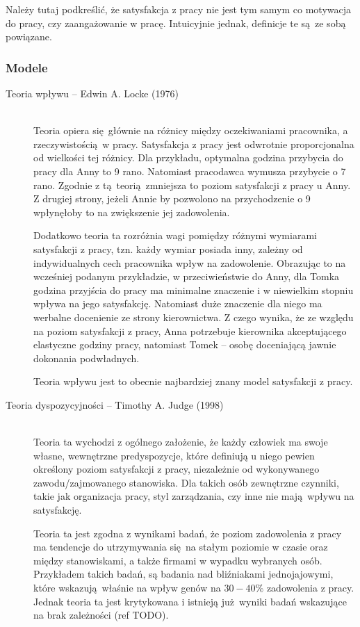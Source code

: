 Należy tutaj podkreślić, że satysfakcja z pracy nie jest tym samym co motywacja do pracy, czy zaangażowanie w pracę. Intuicyjnie jednak, definicje te są ze sobą powiązane.

\subsubsection{Modele}
\begin{description}
\item[Teoria wpływu -- Edwin A. Locke (1976)] \hfill \\
Teoria opiera się głównie na różnicy między oczekiwaniami pracownika, a rzeczywistością w pracy. Satysfakcja z pracy jest odwrotnie proporcjonalna od wielkości tej różnicy. Dla przykładu, optymalna godzina przybycia do pracy dla Anny to 9 rano. Natomiast pracodawca wymusza przybycie o 7 rano. Zgodnie z tą teorią zmniejsza to poziom satysfakcji z pracy u Anny. Z drugiej strony, jeżeli Annie by pozwolono na przychodzenie o 9 wpłynęłoby to na zwiększenie jej zadowolenia.

Dodatkowo teoria ta rozróżnia wagi pomiędzy różnymi wymiarami satysfakcji z pracy, tzn. każdy wymiar posiada inny, zależny od indywidualnych cech pracownika wpływ na zadowolenie. Obrazując to na wcześniej podanym przykładzie, w przeciwieństwie do Anny, dla Tomka godzina przyjścia do pracy ma minimalne znaczenie i w niewielkim stopniu wpływa na jego satysfakcję. Natomiast duże znaczenie dla niego ma werbalne docenienie ze strony kierownictwa. Z czego
wynika, że ze względu na poziom satysfakcji z pracy, Anna potrzebuje kierownika akceptującego elastyczne godziny pracy, natomiast Tomek -- osobę doceniającą jawnie dokonania podwładnych.

Teoria wpływu jest to obecnie najbardziej znany model satysfakcji z pracy.
\item[Teoria dyspozycyjności -- Timothy A. Judge (1998)] \hfill \\
Teoria ta wychodzi z ogólnego założenie, że każdy człowiek ma swoje własne, wewnętrzne predyspozycje, które definiują u niego pewien określony poziom satysfakcji z pracy, niezależnie od wykonywanego zawodu/zajmowanego stanowiska. Dla takich osób zewnętrzne czynniki, takie jak organizacja pracy, styl zarządzania, czy inne nie mają wpływu na satysfakcję.

Teoria ta jest zgodna z wynikami badań, że poziom zadowolenia z pracy ma tendencje do utrzymywania się na stałym poziomie w czasie oraz między stanowiskami, a także firmami w wypadku wybranych osób. Przykładem takich badań, są badania nad bliźniakami jednojajowymi, które wskazują właśnie na wpływ genów na $ 30-40\% $ zadowolenia z pracy. Jednak teoria ta jest krytykowana i istnieją już wyniki badań wskazujące na brak zależności (ref TODO).


\end{description}
